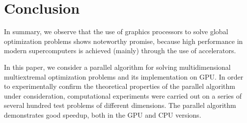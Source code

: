 \documentclass{svproc}
\begin{document}
\section{Conclusion}

In summary, we observe that the use of graphics processors to solve global optimization problems shows noteworthy promise, because high performance in modern supercomputers is achieved (mainly) through the use of accelerators.

In this paper, we consider a parallel algorithm for solving multidimensional multiextremal optimization problems and its implementation on GPU. In order to experimentally confirm the theoretical properties of the parallel algorithm under consideration, computational experiments were carried out on a series of several hundred test problems of different dimensions. The parallel algorithm demonstrates good speedup, both in the GPU and CPU versions.


%
%

{}
\end{document}
